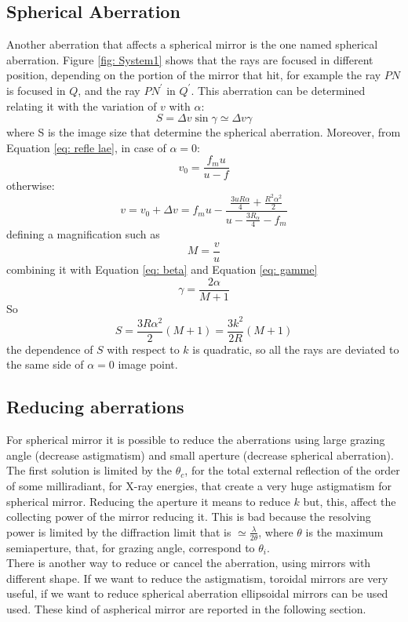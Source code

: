 \subsection{Spherical Aberration}
Another aberration that affects a spherical mirror is the one named spherical aberration. Figure \ref{fig: System1} shows that the rays are focused in different position, depending on the portion of the mirror that hit, for example the ray $PN $ is focused in $Q $, and the ray $PN^{'} $ in $Q^{'} $.  This aberration can be determined relating it with the variation of $v $ with $\alpha$:
\begin{equation}
S = \Delta v \sin \gamma \simeq \Delta v \gamma
\label{eq: S}
\end{equation}
\noindent where S is the image size that determine the spherical aberration. Moreover, from Equation \ref{eq: refle lae}, in case of $\alpha =0 $:
\begin{equation}
v_0 = \frac{f_m u}{u - f}
\label{eq: v0}
\end{equation}
\noindent otherwise:
\begin{equation}
v = v_0 + \Delta v = f_m u - \frac {\frac{3 u R \alpha}{4} + \frac{R^2 \alpha^2}{2}}{u - \frac{3 R_{\alpha}}{4} - f_m}
\label{eq: v}
\end{equation}
\noindent defining a magnification such as
\begin{equation}
M = \frac{v}{u}
\label{eq: M}
\end{equation}
\noindent combining it with Equation \ref{eq: beta} and Equation \ref{eq: gamme}
\begin{equation}
\gamma = \frac{2 \alpha}{M + 1}
\label{eq: new gamme}
\end{equation}
\noindent So
\begin{equation}
S = \frac{3 R \alpha^2}{2} (M + 1) = \frac{3 k^2}{2 R} (M + 1)
\label{eq: new S}
\end{equation}
\noindent the dependence of $S $ with respect to $k $ is quadratic, so all the rays are deviated to the same side of $\alpha = 0$ image point.
\subsection{Reducing aberrations}
For spherical mirror it is possible to reduce the aberrations using large grazing angle (decrease astigmatism) and small aperture (decrease spherical aberration). The first solution is limited by the $\theta_c $, for the total external reflection of the order of some milliradiant, for X-ray energies, that create a very huge astigmatism for spherical mirror.  
Reducing the aperture it means to reduce $k $ but, this, affect the collecting power of the mirror reducing it. This is bad because the resolving power is limited by the diffraction limit that is $\simeq \frac{\lambda}{2 \theta} $, where $\theta $ is the maximum semiaperture, that, for grazing angle, correspond to $\theta_i $.
\\
There is another way to reduce or cancel the aberration, using mirrors with different shape. If we want to reduce the astigmatism, toroidal mirrors are very useful, if we want to reduce spherical aberration ellipsoidal mirrors can be used used. These kind of aspherical mirror are reported in the following section.

